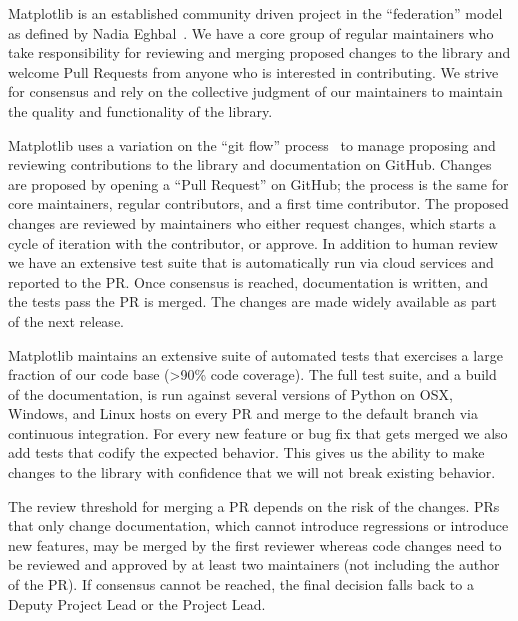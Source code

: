 \documentclass[12pt]{article}
\numberwithin{page}{section}
\begin{document}
Matplotlib is an established community driven project in the
``federation'' model as defined by Nadia Eghbal~\cite{eghbal_2020}.
We have a core group of regular maintainers who take responsibility for
reviewing and merging proposed changes to the library and welcome Pull
Requests from anyone who is interested in contributing.  We strive
for consensus and rely on the collective judgment of our maintainers
to maintain the quality and functionality of the library.

Matplotlib uses a variation on the ``git flow'' process~\cite{ghflow}
to manage proposing and reviewing contributions to the library and
documentation on GitHub.  Changes are proposed by opening a ``Pull
Request'' on GitHub; the process is the same for core maintainers,
regular contributors, and a first time contributor.  The proposed
changes are reviewed by maintainers who either request changes, which
starts a cycle of iteration with the contributor, or approve.  In
addition to human review we have an extensive test suite that is
automatically run via cloud services and reported to
the PR.  Once consensus is reached, documentation is written,
and the tests pass the PR is merged.  The changes are made widely available
as part of the next release.

Matplotlib maintains an extensive suite of automated tests that
exercises a large fraction of our code base (>90\% code coverage).  The full test suite, and
a build of the documentation, is run against several versions of
Python on OSX, Windows, and Linux hosts on every PR and merge to the
default branch via continuous integration.  For every new feature or
bug fix that gets merged we also add tests that codify the expected
behavior.  This gives us the ability to make changes to the library
with confidence that we will not break existing behavior.

The review threshold for merging a PR depends on the risk of the changes.  PRs
that only change documentation, which cannot introduce regressions or introduce
new features, may be merged by the first reviewer whereas code changes need to
be reviewed and approved by at least two maintainers (not including the author
of the PR).  If consensus cannot be reached, the final decision falls back to a
Deputy Project Lead or the Project Lead.
\end{document}
